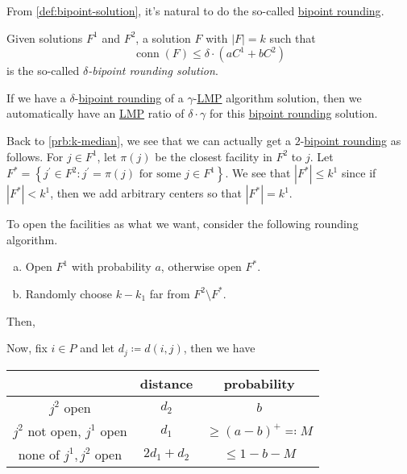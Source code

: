 From \autoref{def:bipoint-solution}, it's natural to do the so-called \hyperref[def:bipoint-rounding]{bipoint rounding}.

\begin{definition}\label{def:bipoint-rounding}
	Given solutions \(F^1\) and \(F^2\), a solution \(F\) with \(\left\vert F \right\vert = k\) such that
	\[
		\mathop{\mathrm{conn}}(F) \leq \delta \cdot (a C^1 + b C^2)
	\]
	is the so-called \emph{\(\delta\)-bipoint rounding solution}.
\end{definition}
\begin{note}
	If we have a \(\delta\)-\hyperref[def:bipoint-rounding]{bipoint rounding} of a \(\gamma \)-\hyperref[def:LMP]{LMP} algorithm solution, then we automatically have an \hyperref[def:LMP]{LMP} ratio of \(\delta \cdot \gamma \) for this \hyperref[def:bipoint-rounding]{bipoint rounding} solution.
\end{note}

Back to \autoref{prb:k-median}, we see that we can actually get a \(2\)-\hyperref[def:bipoint-rounding]{bipoint rounding} as follows. For \(j\in F^1\), let \(\pi (j)\) be the closest facility in \(F^2\) to \(j\). Let \(F^{\ast} = \left\{ j^\prime \in F^2 \colon j^\prime =\pi (j) \text{ for some }j\in F^1  \right\} \). We see that \(\left\vert F^{\ast}  \right\vert \leq k^1\) since if \(\left\vert F^{\ast}  \right\vert < k^1\), then we add arbitrary centers so that \(\left\vert F^{\ast}  \right\vert = k^1\).

To open the facilities as what we want, consider the following rounding algorithm.
\begin{enumerate}[(a)]
	\item Open \(F^1\) with probability \(a\), otherwise open \(F^{\ast} \).
	\item Randomly choose \(k - k_1\) far from \(F^2 \setminus F^{\ast} \).
\end{enumerate}

Then,

Now, fix \(i\in P\) and let \(d_j \coloneqq d(i, j)\), then we have
\begin{table}[H]
	\centering
	\begin{tabular}{c|c|c}
		\toprule
		                               & distance       & probability                  \\
		\midrule
		\(j^2\) open                   & \(d_2\)        & \(b\)                        \\
		\(j^2\) not open, \(j^1\) open & \(d_1\)        & \(\geq (a-b)^+ \eqqcolon M\) \\
		none of \(j^1, j^2\) open      & \(2d_1 + d_2\) & \(\leq 1 - b - M\)           \\
		\bottomrule
	\end{tabular}
\end{table}


